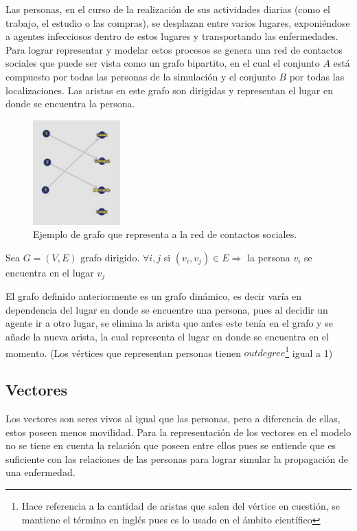 Las personas, en el curso de la realización de sus actividades diarias (como el trabajo, el estudio o las compras),
se desplazan entre varios lugares, exponiéndose a agentes infecciosos dentro de estos lugares y transportando las
enfermedades. Para lograr representar y modelar estos procesos se genera una red de contactos sociales que puede
ser vista como un grafo bipartito, en el cual el conjunto $A$ está compuesto por todas las personas de la simulación
y el conjunto $B$ por todas las localizaciones. Las aristas en este grafo son dirigidas y representan 
el lugar en donde se encuentra la persona.


\begin{figure}[htb]
    \centering
    \includegraphics[width=0.3\textwidth]{Graphics/Grafo_Loc_Pers.jpeg}
    \caption{Ejemplo de grafo que representa a la red de contactos sociales.}
\end{figure}

\begin{center}
    Sea $G = (V,E)$ grafo dirigido. 
    $\forall i,j$ si $(v_i,v_j) \in E \Rightarrow$ la persona $v_i$ se encuentra en el lugar $v_j$ 
\end{center}

El grafo definido anteriormente es un grafo dinámico, es decir varía en dependencia del lugar en donde se encuentre
una persona, pues al decidir un agente ir a otro lugar, se elimina la arista que antes este tenía en el grafo y se 
añade la nueva arista, la cual representa el lugar en donde se encuentra en el momento. (Los vértices que representan
personas tienen $outdegree$\footnote{Hace referencia a la cantidad de aristas que salen del vértice en cuestión, 
se mantiene el término en inglés pues es lo usado en el ámbito científico} igual a 1)

\subsection{Vectores}
Los vectores son seres vivos al igual que las personas, pero a diferencia de ellas, estos poseen menos movilidad. Para la representación de los vectores en el modelo no se tiene en cuenta la relación que 
poseen entre ellos pues se entiende que es suficiente con las relaciones de las personas para lograr simular 
la propagación de una enfermedad.

